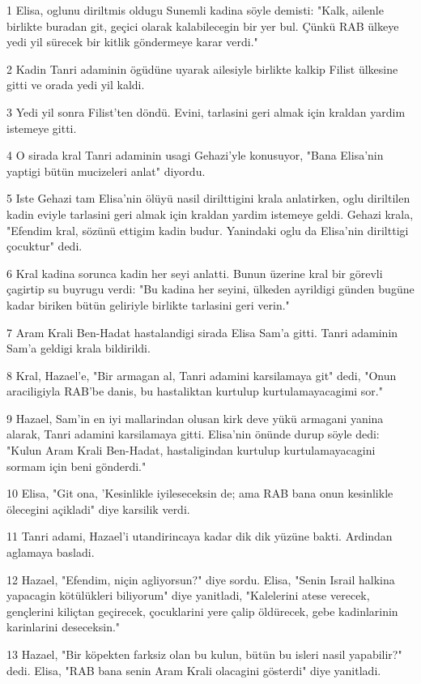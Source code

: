 \par 1 Elisa, oglunu diriltmis oldugu Sunemli kadina söyle demisti: "Kalk, ailenle birlikte buradan git, geçici olarak kalabilecegin bir yer bul. Çünkü RAB ülkeye yedi yil sürecek bir kitlik göndermeye karar verdi."
\par 2 Kadin Tanri adaminin ögüdüne uyarak ailesiyle birlikte kalkip Filist ülkesine gitti ve orada yedi yil kaldi.
\par 3 Yedi yil sonra Filist'ten döndü. Evini, tarlasini geri almak için kraldan yardim istemeye gitti.
\par 4 O sirada kral Tanri adaminin usagi Gehazi'yle konusuyor, "Bana Elisa'nin yaptigi bütün mucizeleri anlat" diyordu.
\par 5 Iste Gehazi tam Elisa'nin ölüyü nasil dirilttigini krala anlatirken, oglu diriltilen kadin eviyle tarlasini geri almak için kraldan yardim istemeye geldi. Gehazi krala, "Efendim kral, sözünü ettigim kadin budur. Yanindaki oglu da Elisa'nin dirilttigi çocuktur" dedi.
\par 6 Kral kadina sorunca kadin her seyi anlatti. Bunun üzerine kral bir görevli çagirtip su buyrugu verdi: "Bu kadina her seyini, ülkeden ayrildigi günden bugüne kadar biriken bütün geliriyle birlikte tarlasini geri verin."
\par 7 Aram Krali Ben-Hadat hastalandigi sirada Elisa Sam'a gitti. Tanri adaminin Sam'a geldigi krala bildirildi.
\par 8 Kral, Hazael'e, "Bir armagan al, Tanri adamini karsilamaya git" dedi, "Onun araciligiyla RAB'be danis, bu hastaliktan kurtulup kurtulamayacagimi sor."
\par 9 Hazael, Sam'in en iyi mallarindan olusan kirk deve yükü armagani yanina alarak, Tanri adamini karsilamaya gitti. Elisa'nin önünde durup söyle dedi: "Kulun Aram Krali Ben-Hadat, hastaligindan kurtulup kurtulamayacagini sormam için beni gönderdi."
\par 10 Elisa, "Git ona, 'Kesinlikle iyileseceksin de; ama RAB bana onun kesinlikle ölecegini açikladi" diye karsilik verdi.
\par 11 Tanri adami, Hazael'i utandirincaya kadar dik dik yüzüne bakti. Ardindan aglamaya basladi.
\par 12 Hazael, "Efendim, niçin agliyorsun?" diye sordu. Elisa, "Senin Israil halkina yapacagin kötülükleri biliyorum" diye yanitladi, "Kalelerini atese verecek, gençlerini kiliçtan geçirecek, çocuklarini yere çalip öldürecek, gebe kadinlarinin karinlarini deseceksin."
\par 13 Hazael, "Bir köpekten farksiz olan bu kulun, bütün bu isleri nasil yapabilir?" dedi. Elisa, "RAB bana senin Aram Krali olacagini gösterdi" diye yanitladi.
